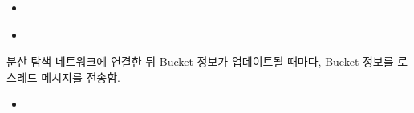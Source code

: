 \documentclass[a4paper,10pt,english]{sphinxmanual}
\begin{document}
\begin{fulllineitems}
\begin{fulllineitems}
\begin{itemize}
\item {} 
\sphinxAtStartPar
{\hyperref[\detokenize{_DHSearch:DHSearch.run}]{}}

\item {} 
\sphinxAtStartPar
{\hyperref[\detokenize{_kademlia:KNode.connect}]{}}

\end{itemize}



\end{fulllineitems}


\begin{fulllineitems}
\label{\detokenize{_DHSearch:DHSearch._dmUpdateBucketList}}
\pysigstartsignatures
{}
\pysigstopsignatures
\sphinxAtStartPar
분산 탐색 네트워크에 연결한 뒤 Bucket 정보가 업데이트될 때마다, Bucket 정보를
{\hyperref[\detokenize{_DHDaemon:dhdaemon}]{}} 로  스레드 메시지를 전송함.


\nopagebreak

\begin{itemize}
\item {} 
\sphinxAtStartPar
{\hyperref[\detokenize{_DHDaemon:DHDaemon._dhSearchListener}]{}}

\end{itemize}



\end{fulllineitems}



\end{fulllineitems}
\end{document}
